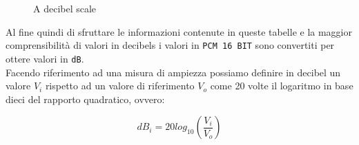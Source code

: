 \begin{figure}[!ht]
\begin{center}
\caption{A decibel scale}
\label{img:decibels}
\end{center}
\end{figure}

Al fine quindi di sfruttare le informazioni contenute in queste tabelle e la maggior comprensibilità di valori in decibels i valori in \texttt{PCM 16 BIT} sono convertiti per ottere valori in \texttt{dB}.\\

Facendo riferimento ad una misura di ampiezza possiamo definire in decibel un valore $V_i$ rispetto ad un valore di riferimento $V_o$ come 20 volte il logaritmo in base dieci del rapporto quadratico, ovvero:

\begin{equation}
dB_i = 20log_{10} \left(\frac{V_i}{V_o}\right)
\end{equation}

